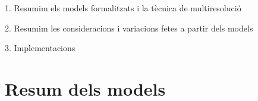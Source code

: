 1. Resumim els models formalitzats i la tècnica de multiresolució

2. Resumim les consideracions i variacions fetes a partir dels models

3. Implementacions






















\section{Resum dels models}


